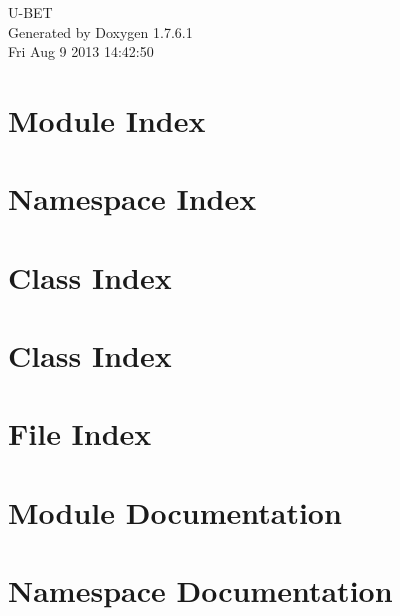 \documentclass[a4paper]{book}
\begin{document}
\hypersetup{pageanchor=false,citecolor=blue}
\begin{titlepage}
\vspace*{7cm}
\begin{center}
{\Large \-U-\/\-B\-E\-T }\\
\vspace*{1cm}
{\large \-Generated by Doxygen 1.7.6.1}\\
\vspace*{0.5cm}
{\small Fri Aug 9 2013 14:42:50}\\
\end{center}
\end{titlepage}
\clearemptydoublepage
{}
\tableofcontents
\clearemptydoublepage
{}
\hypersetup{pageanchor=true,citecolor=blue}
\chapter{\-Module \-Index}

\chapter{\-Namespace \-Index}

\chapter{\-Class \-Index}

\chapter{\-Class \-Index}

\chapter{\-File \-Index}

\chapter{\-Module \-Documentation}




\chapter{\-Namespace \-Documentation}

\end{document}
